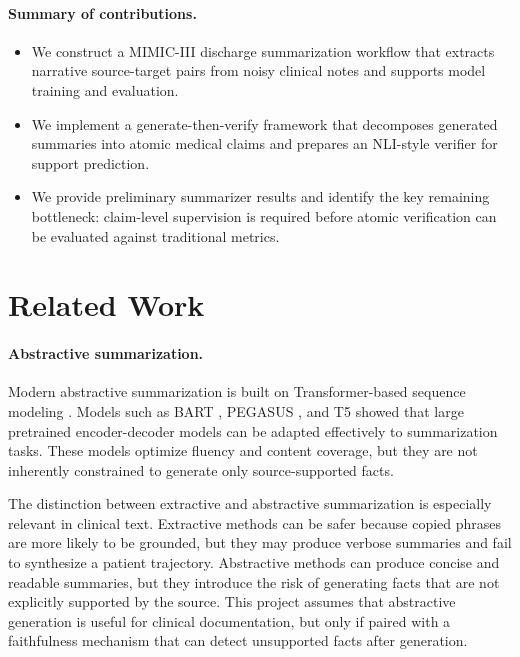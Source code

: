 \documentclass[11pt]{article}
\begin{document}
\paragraph{Summary of contributions.}
\begin{itemize}
    \item We construct a MIMIC-III discharge summarization workflow that extracts narrative source-target pairs from noisy clinical notes and supports model training and evaluation.
    \item We implement a generate-then-verify framework that decomposes generated summaries into atomic medical claims and prepares an NLI-style verifier for support prediction.
    \item We provide preliminary summarizer results and identify the key remaining bottleneck: claim-level supervision is required before atomic verification can be evaluated against traditional metrics.
\end{itemize}

\section{Related Work}

\paragraph{Abstractive summarization.}
Modern abstractive summarization is built on Transformer-based sequence modeling \cite{vaswani2017attention}. Models such as BART \cite{lewis2020bart}, PEGASUS \cite{zhang2020pegasus}, and T5 \cite{raffel2020exploring} showed that large pretrained encoder-decoder models can be adapted effectively to summarization tasks. These models optimize fluency and content coverage, but they are not inherently constrained to generate only source-supported facts.

The distinction between extractive and abstractive summarization is especially relevant in clinical text. Extractive methods can be safer because copied phrases are more likely to be grounded, but they may produce verbose summaries and fail to synthesize a patient trajectory. Abstractive methods can produce concise and readable summaries, but they introduce the risk of generating facts that are not explicitly supported by the source. This project assumes that abstractive generation is useful for clinical documentation, but only if paired with a faithfulness mechanism that can detect unsupported facts after generation.
\end{document}
